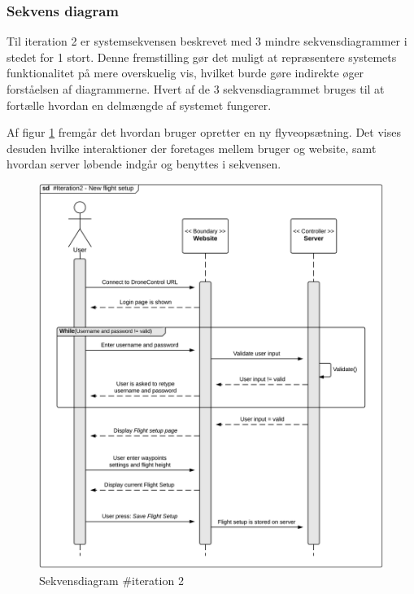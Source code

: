 \newpage

\subsubsection*{Sekvens diagram}

Til iteration 2 er systemsekvensen beskrevet med 3 mindre sekvensdiagrammer i stedet for 1 stort. 
Denne fremstilling gør det muligt at repræsentere systemets funktionalitet på mere overskuelig vis, hvilket burde gøre indirekte øger forståelsen af diagrammerne. Hvert af de 3 sekvensdiagrammet bruges til at fortælle hvordan en delmængde af systemet fungerer.

Af figur \ref{fig:Sekvens_diagram_iteration2_1} fremgår det hvordan bruger opretter en ny flyveopsætning. Det vises desuden hvilke interaktioner der foretages mellem bruger og website, samt hvordan server løbende indgår og benyttes i sekvensen. 

\begin{figure}[H]
	\centering
	\includegraphics[width=1\textwidth]{Billeder/sekvens/sekvens_iteration2_1}
	\caption{Sekvensdiagram \#iteration 2}
	\label{fig:Sekvens_diagram_iteration2_1}
\end{figure}


